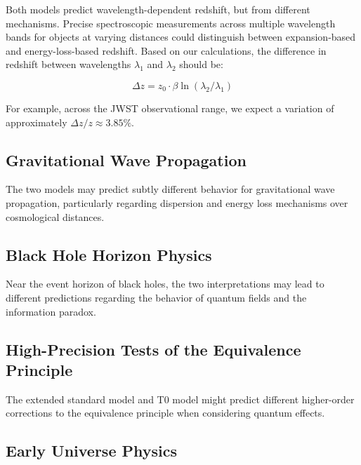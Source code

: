 \documentclass[12pt,a4paper]{article}
\begin{document}
	Both models predict wavelength-dependent redshift, but from different mechanisms\cite{pascher_messdifferenzen_2025}. Precise spectroscopic measurements across multiple wavelength bands for objects at varying distances could distinguish between expansion-based and energy-loss-based redshift. Based on our calculations, the difference in redshift between wavelengths $\lambda_1$ and $\lambda_2$ should be:
	
	\begin{equation}
		\label{eq:delta_z}
		\Delta z = z_0 \cdot \beta \ln(\lambda_2/\lambda_1)
	\end{equation}
	
	For example, across the JWST observational range, we expect a variation of approximately $\Delta z / z \approx 3.85\%$\cite{pascher_messdifferenzen_2025}.
	
	\subsection{Gravitational Wave Propagation}
	\label{subsec:grav_wave_tests}
	
	The two models may predict subtly different behavior for gravitational wave propagation\cite{pascher_emergente_gravitation_2025}, particularly regarding dispersion and energy loss mechanisms over cosmological distances\cite{abbott2016}.
	
	\subsection{Black Hole Horizon Physics}
	\label{subsec:black_hole_tests}
	
	Near the event horizon of black holes, the two interpretations may lead to different predictions regarding the behavior of quantum fields and the information paradox\cite{hawking1975, pascher_emergente_gravitation_2025}.
	
	\subsection{High-Precision Tests of the Equivalence Principle}
	\label{subsec:equivalence_tests}
	
	The extended standard model and T0 model might predict different higher-order corrections to the equivalence principle when considering quantum effects\cite{pascher_feldtheorie_2025, will2014}.
	
	\subsection{Early Universe Physics}
	\label{subsec:early_universe_tests}
	
\end{document}
